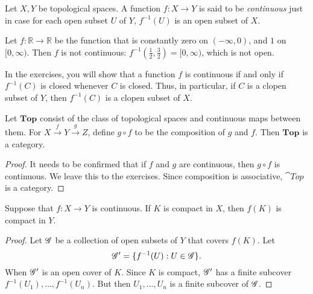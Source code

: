 \begin{defn} Let $X,Y$ be topological spaces.  A function $f:X\to Y$
  is said to be \emph{continuous} just in case for each open subset
  $U$ of $Y$, $f^{-1}(U)$ is an open subset of $X$.  \end{defn}

\begin{example} Let $f:\mathbb{R}\to \mathbb{R}$ be the function that
  is constantly zero on $(-\infty ,0)$, and $1$ on $[0,\infty )$.
  Then $f$ is not continuous:
  $f^{-1}(\frac{1}{2},\frac{3}{2})=[0,\infty )$, which is not
  open. \end{example}

In the exercises, you will show that a function $f$ is continuous if
and only if $f^{-1}(C)$ is closed whenever $C$ is closed.  Thus, in
particular, if $C$ is a clopen subset of $Y$, then $f^{-1}(C)$ is a
clopen subset of $X$.


\begin{prop} Let $\mathbf{Top}$ consist of the class of topological
  spaces and continuous maps between them.  For $X\stackrel{f}{\to}
  Y\stackrel{g}{\to }Z$, define $g\circ f$ to be the composition of
  $g$ and $f$.  Then $\mathbf{Top}$ is a category. \end{prop}

\begin{proof} It needs to be confirmed that if $f$ and $g$ are
  continuous, then $g\circ f$ is continuous.  We leave this to the
  exercises.  Since composition is associative, $\cat{Top}$ is a
  category. \end{proof}


\begin{prop} Suppose that $f:X\to Y$ is continuous.  If $K$ is compact
  in $X$, then $f(K)$ is compact in
  $Y$. \label{image-compact} \end{prop}

\begin{proof} Let $\mathscr G$ be a collection of open subsets of $Y$ that
  covers $f(K)$.  Let
  \[ \mathscr G ' = \{ f^{-1}(U) :U\in \mathscr G \} .\] When $\mathscr G '$ is an open
  cover of $K$.  Since $K$ is compact, $\mathscr G '$ has a finite subcover
  $f^{-1}(U_1),\dots ,f^{-1}(U_n)$.  But then $U_1,\dots ,U_n$ is a
  finite subcover of $\mathscr G$. \end{proof}


